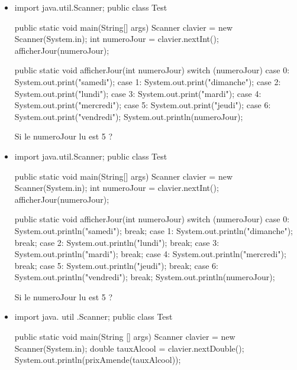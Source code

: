 \documentclass[11pt,a4paper]{article}
\begin{document}
					\begin{itemize}
				
			\item \begin{Java}
import java.util.Scanner;
public class Test{
  public static void main(String[] args){
      Scanner clavier = new Scanner(System.in);
      int numeroJour = clavier.nextInt();
      afficherJour(numeroJour);
  }
    
  public static void afficherJour(int numeroJour){
      switch (numeroJour) {
        case 0: System.out.print("samedi");
        case 1: System.out.print("dimanche");
        case 2: System.out.print("lundi");
        case 3: System.out.print("mardi");
        case 4: System.out.print("mercredi");
        case 5: System.out.print("jeudi");
        case 6: System.out.print("vendredi");
      }
      System.out.println(numeroJour);
  }
}
				\end{Java}Si le numeroJour lu est 5 ? 
            \par
         \textcolor{gray}{\underline{\hspace*{10em}}} 
			\item \begin{Java}
import java.util.Scanner;
public class Test{
  public static void main(String[] args){
      Scanner clavier = new Scanner(System.in);
      int numeroJour = clavier.nextInt();
      afficherJour(numeroJour);
  }
    
  public static void afficherJour(int numeroJour){
      switch (numeroJour) {
        case 0: System.out.println("samedi"); break;
        case 1: System.out.println("dimanche"); break;
        case 2: System.out.println("lundi"); break;
        case 3: System.out.println("mardi"); break;
        case 4: System.out.println("mercredi"); break;
        case 5: System.out.println("jeudi"); break;
        case 6: System.out.println("vendredi"); break;
      }
      System.out.println(numeroJour);
  }
}
				\end{Java}Si le numeroJour lu est 5 ? 
            \par
         \textcolor{gray}{\underline{\hspace*{5em}}} 
			\item \begin{Java}

import java. util .Scanner;
public class Test {
    public static void main(String [] args) {
      Scanner clavier = new Scanner(System.in);
      double tauxAlcool = clavier.nextDouble();
      System.out.println(prixAmende(tauxAlcool));
    }
    
}
\end{Java}
\end{itemize}
\end{document}

